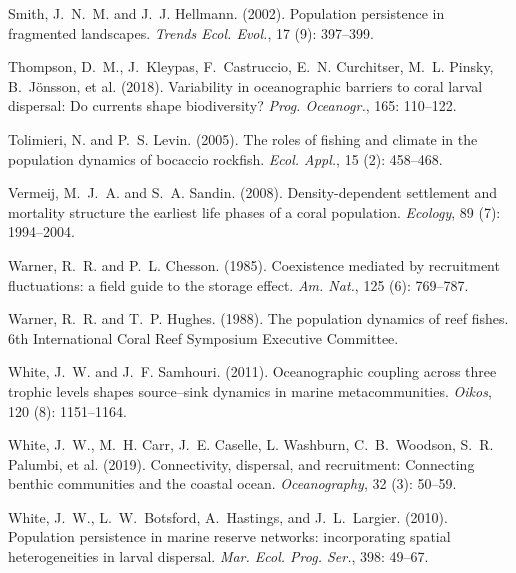 \documentclass[12pt, oneside]{article}   	%
\begin{document}
\begin{thebibliography}{66}
Smith, J.~N.~M. and J.~J. Hellmann. (2002).
\newblock Population persistence in fragmented landscapes.
\newblock \emph{Trends Ecol. Evol.}, 17 (9):
  397--399.

Thompson, D.~M., J.~Kleypas, F.~Castruccio, E.~N. Curchitser, M.~L.
  Pinsky, B.~J{\"o}nsson, et al. (2018).
\newblock Variability in oceanographic barriers to coral larval dispersal: Do
  currents shape biodiversity?
\newblock \emph{Prog. Oceanogr.}, 165: 110--122.

Tolimieri, N. and P.~S. Levin. (2005).
\newblock The roles of fishing and climate in the population dynamics of
  bocaccio rockfish.
\newblock \emph{Ecol. Appl.}, 15 (2): 458--468.

Vermeij, M.~J.~A. and S.~A. Sandin. (2008).
\newblock Density-dependent settlement and mortality structure the earliest
  life phases of a coral population.
\newblock \emph{Ecology}, 89 (7): 1994--2004.

Warner, R.~R. and P.~L. Chesson. (1985).
\newblock Coexistence mediated by recruitment fluctuations: a field guide to
  the storage effect.
\newblock \emph{Am. Nat.}, 125 (6): 769--787.

Warner, R.~R. and T.~P. Hughes. (1988).
\newblock The population dynamics of reef fishes.
\newblock 6th International Coral Reef Symposium Executive Committee.

White, J.~W. and J.~F. Samhouri. (2011).
\newblock Oceanographic coupling across three trophic levels shapes
  source--sink dynamics in marine metacommunities.
\newblock \emph{Oikos}, 120 (8): 1151--1164.

White, J.~W., M.~H. Carr, J.~E. Caselle, L. Washburn, C.~B.~Woodson, S.~R. Palumbi, et al. (2019).
\newblock Connectivity, dispersal, and recruitment: Connecting benthic communities and the coastal ocean.
\newblock \emph{Oceanography}, 32 (3): 50--59.

White, J.~W., L.~W.~Botsford, A.~Hastings, and J.~L.~Largier. (2010).
\newblock Population persistence in marine reserve networks: incorporating
  spatial heterogeneities in larval dispersal.
\newblock \emph{Mar. Ecol. Prog. Ser.}, 398: 49--67.

\end{thebibliography}
\end{document}

